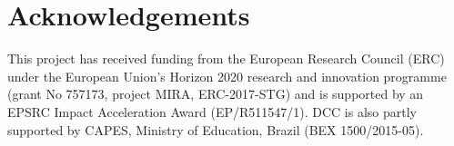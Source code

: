 \documentclass{article}
\begin{document}
\vspace{-2mm}
\section*{Acknowledgements}
\vspace{-2mm}
This project has received funding from the European Research Council (ERC) under the European Union's Horizon 2020 research and innovation programme (grant No 757173, project MIRA, ERC-2017-STG) and is supported by an EPSRC Impact Acceleration Award (EP/R511547/1). DCC is also partly supported by CAPES, Ministry of Education, Brazil (BEX 1500/2015-05).

\vspace{-2mm}


\end{document}
